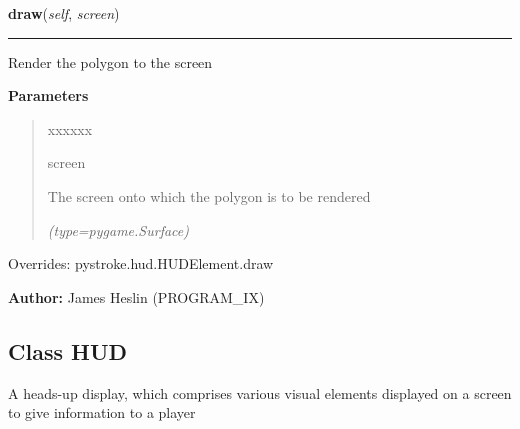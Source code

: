     \vspace{0.5ex}

\hspace{.8\funcindent}\begin{boxedminipage}{\funcwidth}

    \raggedright \textbf{draw}(\textit{self}, \textit{screen})

    \vspace{-1.5ex}

    \rule{\textwidth}{0.5\fboxrule}
\setlength{\parskip}{2ex}
    Render the polygon to the screen

\setlength{\parskip}{1ex}
      \textbf{Parameters}
      \vspace{-1ex}

      \begin{quote}
        \begin{Ventry}{xxxxxx}

          \item[screen]

          The screen onto which the polygon is to be rendered

            {\it (type=pygame.Surface)}

        \end{Ventry}

      \end{quote}

      Overrides: pystroke.hud.HUDElement.draw

\textbf{Author:} James Heslin (PROGRAM\_IX)



    \end{boxedminipage}



\subsection{Class HUD}

    \label{pystroke:hud:HUD}
A heads-up display, which comprises various visual elements displayed on a 
screen to give information to a player

